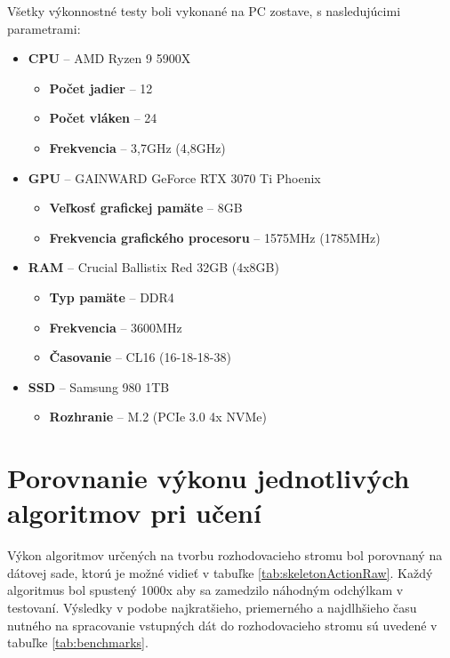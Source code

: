 \documentclass[slovak, master]{diploma}
\begin{document}
Všetky výkonnostné testy boli vykonané na PC zostave, s nasledujúcimi parametrami:
\begin{itemize}
    \item \textbf{CPU} -- AMD Ryzen 9 5900X
    \begin{itemize}
        \item \textbf{Počet jadier} -- 12
        \item \textbf{Počet vláken} -- 24
        \item \textbf{Frekvencia} -- 3,7GHz (4,8GHz)
    \end{itemize}
    \item \textbf{GPU} -- GAINWARD GeForce RTX 3070 Ti Phoenix
    \begin{itemize}
        \item \textbf{Veľkosť grafickej pamäte} -- 8GB
        \item \textbf{Frekvencia grafického procesoru} -- 1575MHz (1785MHz)
    \end{itemize}
    \item \textbf{RAM} -- Crucial Ballistix Red 32GB (4x8GB)
    \begin{itemize}
        \item \textbf{Typ pamäte} -- DDR4
        \item \textbf{Frekvencia} -- 3600MHz
        \item \textbf{Časovanie} -- CL16 (16-18-18-38)
    \end{itemize}
    \item \textbf{SSD} -- Samsung 980 1TB
    \begin{itemize}
        \item \textbf{Rozhranie} -- M.2 (PCIe 3.0 4x NVMe)
    \end{itemize}
\end{itemize}

\section{Porovnanie výkonu jednotlivých algoritmov pri učení}
\label{sec:id3d45cart}
Výkon algoritmov určených na tvorbu rozhodovacieho stromu bol porovnaný na dátovej sade, ktorú je možné vidieť v tabuľke \ref{tab:skeletonActionRaw}. Každý algoritmus bol spustený 1000x aby sa zamedzilo náhodným odchýlkam v testovaní. Výsledky v podobe najkratšieho, priemerného a najdlhšieho času nutného na spracovanie vstupných dát do rozhodovacieho stromu sú uvedené v tabuľke \ref{tab:benchmarks}.
\end{document}
